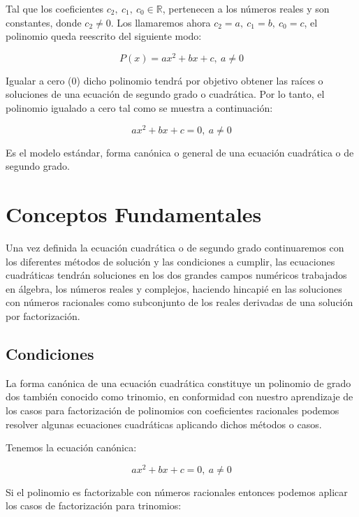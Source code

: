 \documentclass[A4paper, 10pt, oneside]{book}
\begin{document}
	Tal que los coeficientes $\displaystyle{c_2, \ c_1, \ c_0 \in \mathbb{R}}$, pertenecen a los números reales y son constantes, donde $c_2 \neq 0$. Los llamaremos ahora $c_2 = a, \ c_1 = b, \ c_0 = c$, el polinomio queda reescrito del siguiente modo:
	
	$$P(x)=ax^2+bx+c, \ a \neq 0$$
	
	Igualar a cero (0) dicho polinomio tendrá por objetivo obtener las raíces o soluciones de una ecuación de segundo grado o cuadrática. Por lo tanto, el polinomio igualado a cero tal como se muestra a continuación: 
	
	$$ax^2+bx+c=0, \ a \neq 0$$
	
	Es el modelo estándar, forma canónica o    general de una ecuación cuadrática o de segundo grado. 
	
	\section{Conceptos Fundamentales}
	Una vez definida la ecuación cuadrática o de segundo grado continuaremos con los diferentes métodos de solución y las condiciones a cumplir, las ecuaciones cuadráticas tendrán soluciones en los dos grandes campos numéricos trabajados en álgebra, los números reales y complejos, haciendo hincapié en las soluciones con números racionales como subconjunto de los reales derivadas de una solución por factorización. 
	
	\subsection{Condiciones}
	La forma canónica de una ecuación cuadrática constituye un polinomio de grado dos también conocido como trinomio, en conformidad con nuestro aprendizaje de los casos para factorización de polinomios con coeficientes racionales podemos resolver algunas ecuaciones cuadráticas aplicando dichos métodos o casos. 
	
	Tenemos la ecuación canónica: 
	
	$$ax^2+bx+c=0, \ a \neq 0$$
	
	Si el polinomio es factorizable con números racionales entonces podemos aplicar los casos de factorización para trinomios:
	
\end{document}
